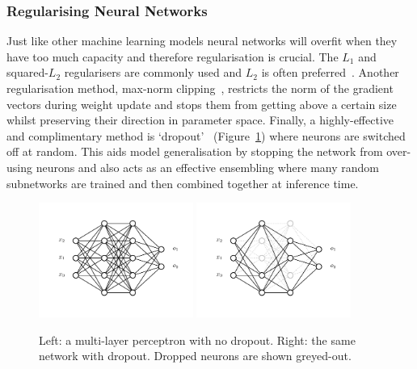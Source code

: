 \subsubsection{Regularising Neural Networks}
Just like other machine learning models neural networks will overfit when they have too much capacity and therefore regularisation is crucial. The $L_{1}$ and squared-$L_{2}$ regularisers are commonly used and $L_{2}$ is often preferred~\cite{CS231n}. Another regularisation method, max-norm clipping~\cite{CS231n}, restricts the norm of the gradient vectors during weight update and stops them from getting above a certain size whilst preserving their direction in parameter space. Finally, a highly-effective and complimentary method is `dropout'~\cite{Dropout} (Figure~\ref{fig:machine_learning:dropout})  where neurons are switched off at random. This aids model generalisation by stopping the network from over-using neurons and also acts as an effective ensembling where many random subnetworks are trained and then combined together at inference time.  
\begin{figure}[h!]
    \begin{center}
        \includegraphics[width=0.45\textwidth]{figures/machine_learning/no_dropout.pdf}
        \includegraphics[width=0.45\textwidth]{figures/machine_learning/dropout.pdf}
    \end{center}
    \caption{Left: a multi-layer perceptron with no dropout. Right: the same network with dropout. Dropped neurons are shown greyed-out.}
        \label{fig:machine_learning:dropout}
\end{figure}

